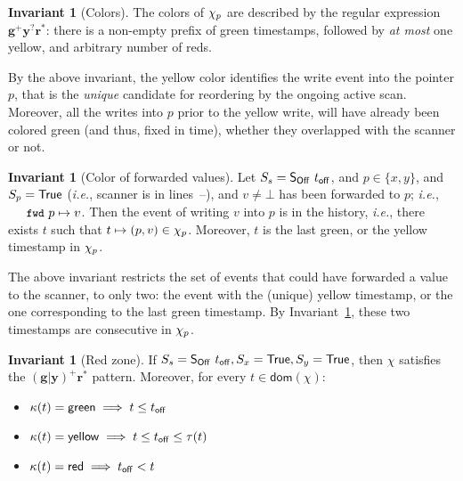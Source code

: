 \documentclass[a4paper,UKenglish]{lipics-v2016}
\newcommand{\ie}{\emph{i.e.}\xspace}
\newcommand{\dom}[1]{\mathsf{dom}(#1)}
\newcommand{\hist}{\chi}
\newcommand{\hpts}{\mapsto}
\def\TT{\mathsf{True}}
\def\GYR{{\mathbf{{g^{+}}{y^{?}}{r^{*}}}}}
\def\RZ{{\mathbf{{{(g | y)^{+}}}{r^{*}}}}}
\newcommand{\E}{\tau}
\newcommand{\C}{\kappa}
\newcommand{\sOff}{\mathsf{S_{Off}}}
\theoremstyle{definition}
\newtheorem{invariant}[theorem]{Invariant}
\begin{document}

\begin{invariant}[Colors]\label{inv:color}%
The colors of $\histp$ are described by the regular expression $\GYR$:
there is a non-empty prefix of green timestamps, followed by \emph{at
  most} one yellow, and arbitrary number of reds.
\end{invariant}

By the above invariant, the yellow color identifies the write event
into the pointer $p$, that is the \emph{unique} candidate for
reordering by the ongoing active scan. Moreover, all the writes into
$p$ prior to the yellow write, will have already been colored green
(and thus, fixed in time), whether they overlapped with the scanner or
not.

\begin{invariant}[Color of forwarded values]\label{inv:readFP}%
Let $\sss= \sOff\ \toff$, and $p \in \{x, y\}$, and $\spp = \TT$ (\ie,
scanner is in lines~\lineScanReadsFX--\lineScanChoosesRY), and $v \neq
\bot$ has been forwarded to $p$; \ie, $\aleksfwdp{p} \hpts v$. Then
the event of writing $v$ into $p$ is in the history, \ie, there exists
$t$ such that $t \hpts (p, v) \in \histp$. Moreover, $t$ is the last
green, or the yellow timestamp in $\histp$.
\end{invariant}

The above invariant restricts the set of events that could have
forwarded a value to the scanner, to only two: the event with the
(unique) yellow timestamp, or the one corresponding to the last green
timestamp. By Invariant~\ref{inv:color}, these two timestamps are
consecutive in $\histp$.


\begin{invariant}[Red zone]\label{inv:redzone}%
If $\sss = \sOff\ \toff, \sx = \TT, \sy = \TT$, then $\hist$ satisfies
the $\RZ$ pattern. Moreover, for every $t \in \dom{\hist}$:
%
\begin{itemize}
\item $\C(t) = \mathsf{green} \implies t \leq \toff$
\item $\C(t) = \mathsf{yellow} \implies t \leq \toff \leq \E (t)$
\item $\C(t) = \mathsf{red} \implies \toff < t$  
\end{itemize}
\end{invariant}
\end{document}
